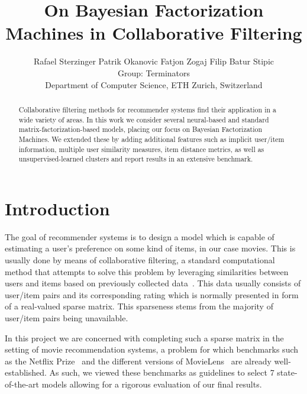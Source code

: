 \documentclass[10pt,conference,compsocconf]{IEEEtran}
\newcommand{\spacing}{\hspace{1cm}}
\begin{document}
    \setlength{\abovedisplayskip}{2pt}
    \setlength{\belowdisplayskip}{2pt}
    \setlength{\abovedisplayshortskip}{2pt}
    \setlength{\belowdisplayshortskip}{2pt}
    \title{On Bayesian Factorization Machines in Collaborative Filtering}

    \author{
        Rafael Sterzinger \spacing Patrik Okanovic \spacing Fatjon Zogaj \spacing Filip Batur Stipic\\
        Group: Terminators\\
        Department of Computer Science, ETH Zurich, Switzerland
    }

    \maketitle

    \begin{abstract}
        Collaborative filtering methods for recommender systems find their application in a wide variety of areas.
        In this work we consider several neural-based and standard matrix-factorization-based models, placing our focus on Bayesian Factorization Machines.
        We extended these by adding additional features such as implicit user/item information, multiple user similarity measures, item distance metrics, as well as unsupervised-learned clusters and report results in an extensive benchmark.
    \end{abstract}


    \section{Introduction}

    The goal of recommender systems is to design a model which is capable of estimating a user's preference on some kind of items, in our case movies.
    This is usually done by means of collaborative filtering, a standard computational method that attempts to solve this problem by leveraging similarities between users and items based on previously collected data~\cite{CF_survey}.
    This data usually consists of user/item pairs and its corresponding rating which is normally presented in form of a real-valued sparse matrix.
    This sparseness stems from the majority of user/item pairs being unavailable.

    In this project we are concerned with completing such a sparse matrix in the setting of movie recommendation systems, a problem for which benchmarks such as the Netflix Prize~\cite{Netflix} and the different versions of MovieLens~\cite{Movielens} are already well-established.
    As such, we viewed these benchmarks as guidelines to select 7 state-of-the-art models allowing for a rigorous evaluation of our final results.
\end{document}
